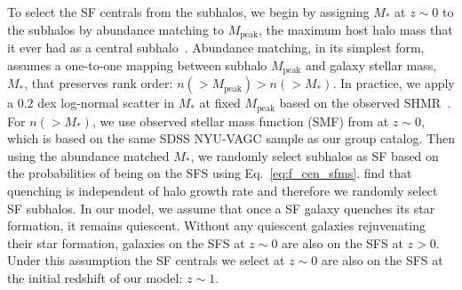 \documentclass[12pt, letterpaper, preprint, tighten]{aastex62}
\begin{document}
To select the SF centrals from the subhalos, we begin by assigning $M_*$
at $z\sim 0$ to the subhalos by abundance matching to $M_\mathrm{peak}$,
the maximum host halo mass that it ever had as a central subhalo~\citep{conroy2006,vale2006,yang2009,wetzel2012,leja2013,wetzel2013,wetzel2014,hahn2017b}.
Abundance matching, in its simplest form, assumes a one-to-one mapping between subhalo
$M_\mathrm{peak}$ and galaxy stellar mass, $M_*$, that preserves rank
order: $n({>}M_\mathrm{peak}) > n({>}M_*)$. In practice, we apply a $0.2$
dex log-normal scatter in $M_*$ at fixed $M_\mathrm{peak}$ based on the
observed SHMR~\citep[\emph{e.g.}][]{mandelbaum2006a, more2011, velander2014, zu2015, gu2016, lange2018a}.
For $n({>}M_*)$, we use observed stellar mass function (SMF)
from \cite{li2009} at $z\sim 0$, which is based on the same SDSS NYU-VAGC sample as our
group catalog. Then using the abundance matched $M_*$, we randomly select subhalos as
SF based on the probabilities of being on the SFS using Eq.~\ref{eq:f_cen_sfms}.
\cite{tinker2017b,tinker2018} find that quenching is
independent of halo growth rate and therefore we randomly select SF subhalos.
In our model, we assume that once a SF galaxy quenches its star formation,
it remains quiescent.  %
Without any quiescent galaxies rejuvenating their star formation, galaxies
on the SFS at $z\sim0$ are also on the SFS at $z > 0$. Under this assumption
the SF centrals we select at $z \sim 0$ are also on the SFS at the initial
redshift of our model: $z \sim 1$.
\end{document}
